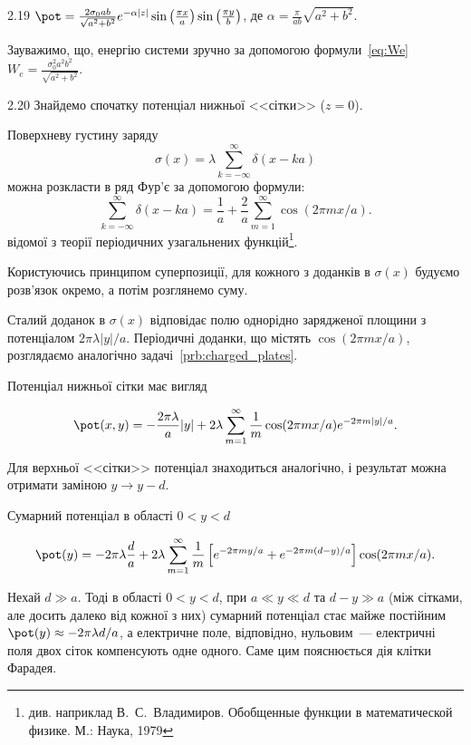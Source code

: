 \begin{Solution}{2.{19}}
	$\pot  = \frac{{2{\sigma _0}ab}}{{\sqrt {{a^2} + {b^2}} }}{e^{ - \alpha |z|}}\sin \left( {\frac{{\pi x}}{a}} \right)\sin \left( {\frac{{\pi y}}{b}} \right)$, де $\alpha  = \frac{\pi }{{ab}}\sqrt {{a^2} + {b^2}}$.

    Зауважимо, що, енергію системи зручно за допомогою формули~\eqref{eq:We}
	$W_e =  \frac{{\sigma _0^2{a^2}{b^2}}}{{\sqrt {{a^2} + {b^2}} }}$.
\end{Solution}
\begin{Solution}{2.{20}}
	Знайдемо спочатку потенціал нижньої <<сітки>> ($z = 0$).

Поверхневу густину заряду
\[
    \sigma(x) = \lambda\sum\limits_{k = -\infty}^{\infty} \delta(x - ka)
\]
можна розкласти в ряд Фур'є за допомогою формули:
	\[
		\sum\limits_{k = -\infty}^{\infty} \delta(x - ka) =  \frac{1}{a} + \frac{2}{a}\sum\limits_{m=1}^{\infty}\cos(2\pi mx/a).
	\]
відомої з теорії періодичних узагальнених функцій\footnote{див. наприклад В.~С.~Владимиров. Обобщенные функции в математической физике. М.: Наука, 1979}.

Користуючись принципом суперпозиції, для кожного з доданків в $\sigma(x)$  будуємо розв’язок окремо, а потім розглянемо суму.

Сталий доданок в $\sigma(x)$  відповідає полю однорідно зарядженої площини з потенціалом $2\pi\lambda|y|/a$. Періодичні доданки, що містять $\cos(2\pi mx/a)$, розглядаємо аналогічно задачі~\ref{prb:charged_plates}.

Потенціал нижньої сітки має вигляд


	\[
		\pot(x,y) = -\frac{2\pi\lambda}{a}|y| + 2\lambda\sum\limits_{m = 1}^{\infty} \frac1m \cos(2\pi mx/a)e^{-2\pi m|y|/a}.
	\]

	Для верхньої  <<сітки>> потенціал знаходиться аналогічно, і результат можна отримати заміною $y \to y - d$.

    Сумарний потенціал в області $0 < y <d$


	\[
		\pot(y) = -2\pi\lambda\frac{d}{a} + 2\lambda\sum\limits_{m = 1}^{\infty} \frac1m \left[ e^{-2\pi my/a} +  e^{-2\pi m (d - y)/a} \right] \cos(2\pi mx/a).
	\]

Нехай $d \gg a$. Тоді в області $0<y<d$, при $a \ll y \ll d$ та $d - y \gg a$ (між сітками, але досить далеко від кожної з них) сумарний потенціал стає майже постійним $\pot(y) \approx  - 2\pi \lambda d/a$, а електричне поле, відповідно, нульовим~--- електричні поля двох сіток компенсують одне одного.  Саме цим пояснюється дія клітки Фарадея.

\end{Solution}
